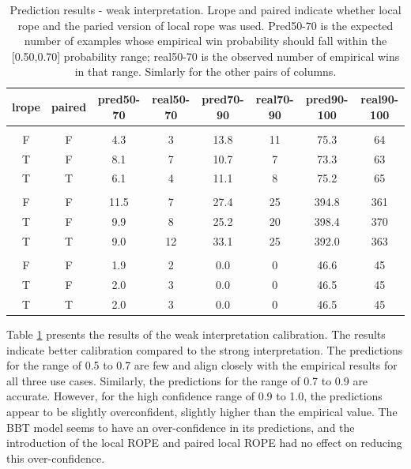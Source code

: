\documentclass[twoside,11pt,preprint]{article}
\begin{document}
\begin{table}

\caption{\label{tab:predxz2}\label{tab:predw}Prediction results - weak interpretation. Lrope and paired indicate whether local rope and the paried version of local rope was used. Pred50-70 is the expected number of examples whose empirical win  probability should fall within the [0.50,0.70] probability range; real50-70 is the observed number of empirical wins in that range. Simlarly for the other pairs of columns.}
\centering
\begin{tabular}[t]{cccccccc}
\toprule
\textbf{lrope} & \textbf{paired} & \textbf{pred50-70} & \textbf{real50-70} & \textbf{pred70-90} & \textbf{real70-90} & \textbf{pred90-100} & \textbf{real90-100}\\
\midrule
\addlinespace[0.3em]
\multicolumn{8}{l}{\textbf{ss}}\\
\hspace{1em}F & F & 4.3 & 3 & 13.8 & 11 & 75.3 & 64\\
\hspace{1em}T & F & 8.1 & 7 & 10.7 & 7 & 73.3 & 63\\
\hspace{1em}T & T & 6.1 & 4 & 11.1 & 8 & 75.2 & 65\\
\addlinespace[0.3em]
\multicolumn{8}{l}{\textbf{mm}}\\
\hspace{1em}F & F & 11.5 & 7 & 27.4 & 25 & 394.8 & 361\\
\hspace{1em}T & F & 9.9 & 8 & 25.2 & 20 & 398.4 & 370\\
\hspace{1em}T & T & 9.0 & 12 & 33.1 & 25 & 392.0 & 363\\
\addlinespace[0.3em]
\multicolumn{8}{l}{\textbf{sl}}\\
\hspace{1em}F & F & 1.9 & 2 & 0.0 & 0 & 46.6 & 45\\
\hspace{1em}T & F & 2.0 & 3 & 0.0 & 0 & 46.5 & 45\\
\hspace{1em}T & T & 2.0 & 3 & 0.0 & 0 & 46.5 & 45\\
\bottomrule
\end{tabular}
\end{table}

Table \ref{tab:predw} presents the results of the weak interpretation calibration. The results indicate better calibration compared to the strong interpretation. The predictions for the range of 0.5 to 0.7 are few and align closely with the empirical results for all three use cases. Similarly, the predictions for the range of 0.7 to 0.9 are accurate. However, for the high confidence range of 0.9 to 1.0, the predictions appear to be slightly overconfident, slightly higher than the empirical value. The BBT model seems to have an over-confidence in its predictions, and the introduction of the local ROPE and paired local ROPE had no effect on reducing this over-confidence.
\end{document}
